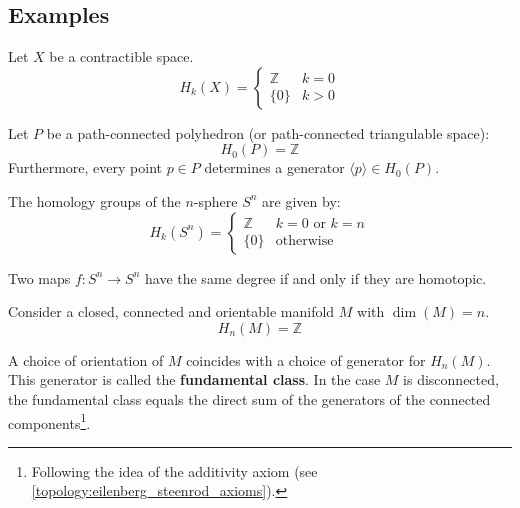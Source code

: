 \subsection{Examples}

	\begin{example}
		Let $X$ be a contractible space.
		\begin{equation}
			H_k(X) = \begin{cases}
				\mathbb{Z}&k=0\\
				\{0\}&k>0
			\end{cases}
		\end{equation}
	\end{example}
	\begin{example}
		Let $P$ be a path-connected polyhedron (or path-connected triangulable space):
		\begin{equation}
			H_0(P) = \mathbb{Z}
		\end{equation}
		Furthermore, every point $p\in P$ determines a generator $\langle p \rangle\in H_0(P)$.
	\end{example}
	\begin{example}
		The homology groups of the $n$-sphere $S^n$ are given by:
		\begin{equation}
			H_k(S^n)=\begin{cases}
				\mathbb{Z}&k=0\text{ or }k=n\\
				\{0\}&\text{otherwise}
			\end{cases}
		\end{equation}
	\end{example}
	\begin{property}
		Two maps $f:S^n\rightarrow S^n$ have the same degree if and only if they are homotopic.
	\end{property}
	
	\begin{example}
		Consider a closed, connected and orientable manifold $M$ with $\dim(M) = n$.
		\begin{equation}
			H_n(M) = \mathbb{Z}
		\end{equation}
	\end{example}
	\begin{result}[Orientation]
		A choice of orientation of $M$ coincides with a choice of generator for $H_n(M)$. This generator is called the \textbf{fundamental class}. In the case $M$ is disconnected, the fundamental class equals the direct sum of the generators of the connected components\footnote{Following the idea of the additivity axiom (see \ref{topology:eilenberg_steenrod_axioms}).}.
	\end{result}

